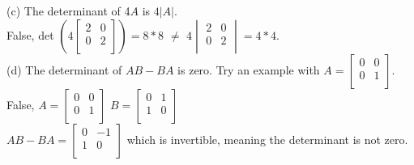 \documentclass[10pt,twoside,reqno]{article}
\begin{document}
\begin{enumerate}
{(c) The determinant of 4$A$ is $4|A|$. \\ \vspace{2mm}
\hspace{3mm}
False, det
$
\left(4
\begin{bmatrix}
2&0\\
0&2\\
\end{bmatrix} \right)
= 8*8
$
 $\neq$ 
$
4
\begin{vmatrix}
2&0\\
0&2\\
\end{vmatrix}
= 4*4
$. \\
\vspace{3mm}
(d) The determinant of $AB-BA$ is zero. Try an example with 
$
A= 
\begin{bmatrix}
0&0\\
0&1\\
\end{bmatrix}
$. \\
\hspace{3mm}
False, 
\hspace{5mm}
$
A=
\begin{bmatrix}
0&0\\
0&1\\
\end{bmatrix}
$
\hspace{5mm}
$
B=
\begin{bmatrix}
0&1\\
1&0\\
\end{bmatrix}
$ \\
\hspace{10mm}
$AB-BA=
\begin{bmatrix}
0&-1\\
1&0\\
\end{bmatrix}
$
 which is invertible, meaning the determinant is not zero. \\
\vspace{3mm}
}


\end{enumerate}
\end{document}
